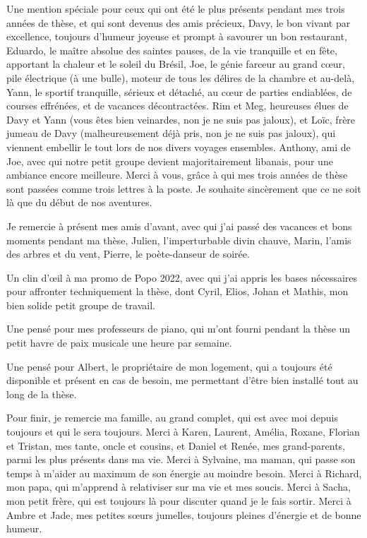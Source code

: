Une mention spéciale pour ceux qui ont été le plus présents pendant mes trois années de thèse, et qui sont devenus des amis précieux, 
Davy, le bon vivant par excellence, toujours d'humeur joyeuse et prompt à savourer un bon restaurant,
Eduardo, le maître absolue des saintes pauses, de la vie tranquille et en fête, apportant la chaleur et le soleil du Brésil,
Joe, le génie farceur au grand c\oe{}ur, pile électrique (à une bulle), moteur de tous les délires de la chambre et au-delà,
Yann, le sportif tranquille, sérieux et détaché, au c\oe{}ur de parties endiablées, de courses effrénées, et de vacances décontractées.
Rim et Meg, heureuses élues de Davy et Yann (vous êtes bien veinardes, non je ne suis pas jaloux), et Loïc, frère jumeau de Davy (malheureusement déjà pris, non je ne suis pas jaloux), qui viennent embellir le tout lors de nos divers voyages ensembles.
Anthony, ami de Joe, avec qui notre petit groupe devient majoritairement libanais, pour une ambiance encore meilleure.
Merci à vous, grâce à qui mes trois années de thèse sont passées comme trois lettres à la poste.
Je souhaite sincèrement que ce ne soit là que du début de nos aventures.

\bigskip

Je remercie à présent mes amis d'avant, avec qui j'ai passé des vacances et bons moments pendant ma thèse,
Julien, l'imperturbable divin chauve,
Marin, l'amis des arbres et du vent,
Pierre, le poète-danseur de soirée.

\bigskip

Un clin d'\oe{}il à ma promo de Popo 2022, avec qui j'ai appris les bases nécessaires pour affronter techniquement la thèse, dont Cyril, Elios, Johan et Mathis, mon bien solide petit groupe de travail.

\bigskip

Une pensé pour mes professeurs de piano, qui m'ont fourni pendant la thèse un petit havre de paix musicale une heure par semaine.

Une pensé pour Albert, le propriétaire de mon logement, qui a toujours été disponible et présent en cas de besoin, me permettant d'être bien installé tout au long de la thèse.

\bigskip

Pour finir, je remercie ma famille, au grand complet, qui est avec moi depuis toujours et qui le sera toujours.
Merci à Karen, Laurent, Amélia, Roxane, Florian et Tristan, mes tante, oncle et cousins, et Daniel et Renée, mes grand-parents, parmi les plus présents dans ma vie.
Merci à Sylvaine, ma maman, qui passe son temps à m'aider au maximum de son énergie au moindre besoin.
Merci à Richard, mon papa, qui m'apprend à relativiser sur ma vie et mes soucis.
Merci à Sacha, mon petit frère, qui est toujours là pour discuter quand je le fais sortir.
Merci à Ambre et Jade, mes petites s\oe{}urs jumelles, toujours pleines d'énergie et de bonne humeur.


\cleardoublepage %
\adjustmtc
